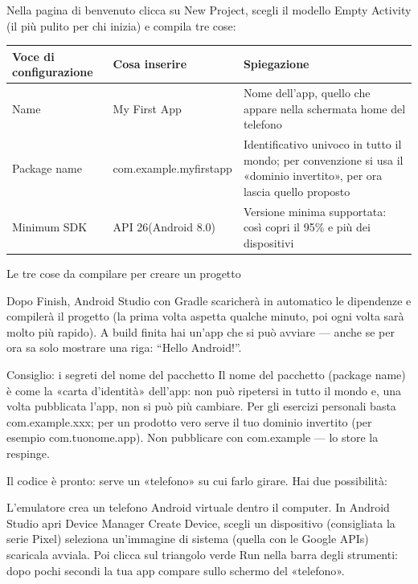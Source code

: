 Nella pagina di benvenuto clicca su New Project, scegli il modello Empty Activity (il più pulito per chi inizia) e compila tre cose:

\begin{center}
\begin{tabularx}{\linewidth}{|X|X|X|}
\hline
\textbf{Voce di configurazione} & \textbf{Cosa inserire} & \textbf{Spiegazione} \tabularnewline
\hline
Name & My First App & Nome dell'app, quello che appare nella schermata home del telefono \tabularnewline
Package name & com.example.myfirstapp & Identificativo univoco in tutto il mondo; per convenzione si usa il «dominio invertito», per ora lascia quello proposto \tabularnewline
Minimum SDK & API 26(Android 8.0) & Versione minima supportata: così copri il 95\% e più dei dispositivi \tabularnewline
\hline
\end{tabularx}
\end{center}

\begin{center}\small\color{gray}Le tre cose da compilare per creare un progetto\end{center}

Dopo Finish, Android Studio con Gradle scaricherà in automatico le dipendenze e compilerà il progetto (la prima volta aspetta qualche minuto, poi ogni volta sarà molto più rapido). A build finita hai un'app che si può avviare — anche se per ora sa solo mostrare una riga: “Hello Android!”.

\begin{tcbinfo}{Consiglio: i segreti del nome del pacchetto}
Il nome del pacchetto (package name) è come la «carta d'identità» dell'app: non può ripetersi in tutto il mondo e, una volta pubblicata l'app, non si può più cambiare. Per gli esercizi personali basta com.example.xxx; per un prodotto vero serve il tuo dominio invertito (per esempio com.tuonome.app). Non pubblicare con com.example — lo store la respinge.

\end{tcbinfo}


Il codice è pronto: serve un «telefono» su cui farlo girare. Hai due possibilità:


L'emulatore crea un telefono Android virtuale dentro il computer. In Android Studio apri Device Manager Create Device, scegli un dispositivo (consigliata la serie Pixel) seleziona un'immagine di sistema (quella con le Google APIs) scaricala avviala. Poi clicca sul triangolo verde Run nella barra degli strumenti: dopo pochi secondi la tua app compare sullo schermo del «telefono».

